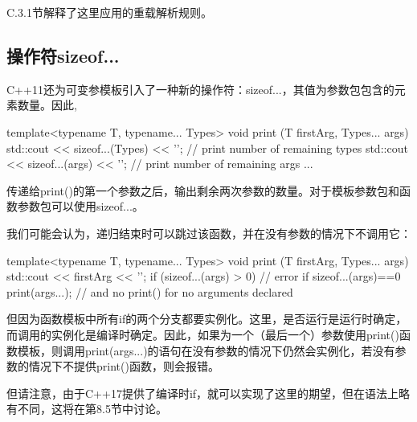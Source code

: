 C.3.1节解释了这里应用的重载解析规则。

\subsection{操作符sizeof...}

C++11还为可变参模板引入了一种新的操作符：sizeof...，其值为参数包包含的元素数量。因此,

\begin{cpp}
template<typename T, typename... Types>
void print (T firstArg, Types... args) {
	std::cout << sizeof...(Types) << '\n'; // print number of remaining types
	std::cout << sizeof...(args) << '\n'; // print number of remaining args
	...
}
\end{cpp}

传递给print()的第一个参数之后，输出剩余两次参数的数量。对于模板参数包和函数参数包可以使用sizeof...。

我们可能会认为，递归结束时可以跳过该函数，并在没有参数的情况下不调用它：

\begin{cpp}
template<typename T, typename... Types>
void print (T firstArg, Types... args) {
	std::cout << firstArg << '\n';
	if (sizeof...(args) > 0) { // error if sizeof...(args)==0
		print(args...); // and no print() for no arguments declared
	}
}
\end{cpp}

但因为函数模板中所有if的两个分支都要实例化。这里，是否运行是运行时确定，而调用的实例化是编译时确定。因此，如果为一个（最后一个）参数使用print()函数模板，则调用print(args...)的语句在没有参数的情况下仍然会实例化，若没有参数的情况下不提供print()函数，则会报错。

但请注意，由于C++17提供了编译时if，就可以实现了这里的期望，但在语法上略有不同，这将在第8.5节中讨论。
























